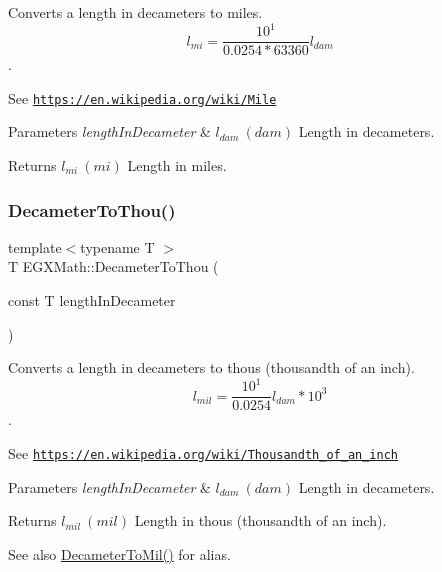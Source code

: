 Converts a length in decameters to miles. \[ l_{mi}=\frac{10^{1}}{0.0254 * 63360} l_{dam} \]. 

See \href{https://en.wikipedia.org/wiki/Mile}{\tt https\+://en.\+wikipedia.\+org/wiki/\+Mile} 
\begin{DoxyParams}{Parameters}
{\em length\+In\+Decameter} & $ l_{dam}\ (dam)$ Length in decameters. \\
\hline
\end{DoxyParams}
\begin{DoxyReturn}{Returns}
$ l_{mi}\ (mi)$ Length in miles. 
\end{DoxyReturn}
\mbox{\label{group___e_g_x_math-_conversions-_length_conversions-_s_i-_decameter-_imperial_ga4f21f4b1df62d1d63f46849c4f38d56b}} 
\subsubsection{\texorpdfstring{Decameter\+To\+Thou()}{DecameterToThou()}}
{\footnotesize\ttfamily template$<$typename T $>$ \\
T E\+G\+X\+Math\+::\+Decameter\+To\+Thou (\begin{DoxyParamCaption}\item[{const T}]{length\+In\+Decameter }\end{DoxyParamCaption})}



Converts a length in decameters to thous (thousandth of an inch). \[ l_{mil}= \frac{10^{1}}{0.0254} l_{dam} * 10^{3} \]. 

See \href{https://en.wikipedia.org/wiki/Thousandth_of_an_inch}{\tt https\+://en.\+wikipedia.\+org/wiki/\+Thousandth\+\_\+of\+\_\+an\+\_\+inch} 
\begin{DoxyParams}{Parameters}
{\em length\+In\+Decameter} & $ l_{dam}\ (dam)$ Length in decameters. \\
\hline
\end{DoxyParams}
\begin{DoxyReturn}{Returns}
$ l_{mil}\ (mil)$ Length in thous (thousandth of an inch). 
\end{DoxyReturn}
\begin{DoxySeeAlso}{See also}
\mbox{\hyperlink{group___e_g_x_math-_conversions-_length_conversions-_s_i-_decameter-_imperial_gaee77251b6c2f2e8e0feae0032e80e0c3}{Decameter\+To\+Mil()}} for alias. 
\end{DoxySeeAlso}
\mbox{\label{group___e_g_x_math-_conversions-_length_conversions-_s_i-_decameter-_imperial_ga42a81b14a91ba9ddb4967faa55b6a3a0}} 
